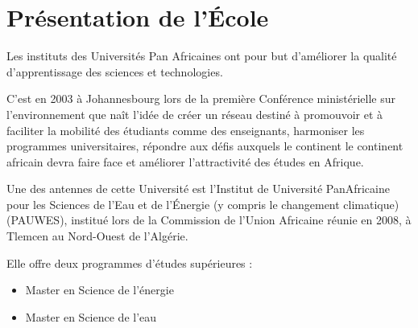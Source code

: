 \documentclass[oneside]{report}
\begin{document}
	\chapter{Présentation de l'École}
	{
		
		\par Les instituts des Universités Pan Africaines ont pour but d’améliorer la qualité d'apprentissage des sciences et technologies.
		\vspace{1cm}
		\par C’est en 2003 à Johannesbourg lors de la première Conférence ministérielle sur l’environnement que naît l’idée de créer un réseau destiné à promouvoir et à faciliter la mobilité des étudiants comme des enseignants, harmoniser les programmes universitaires, répondre aux défis auxquels le continent le continent africain devra faire face et améliorer l’attractivité des études en Afrique.
		\vspace{1cm}
		\par Une des antennes de cette Université est l’Institut de Université PanAfricaine pour les Sciences de l’Eau et de l'Énergie (y compris le changement climatique) (PAUWES), institué lors de la Commission de l’Union Africaine réunie en 2008, à Tlemcen au Nord-Ouest de l’Algérie. 
		\vspace{1cm}
		\par Elle offre deux programmes d’études supérieures :
		\begin{itemize}
			\item{Master en Science de l’énergie}
			\item{Master en Science de l’eau}
		\end{itemize}
	}
\end{document}
